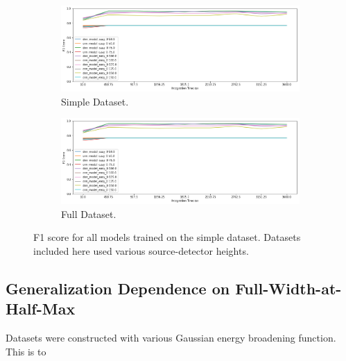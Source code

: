 \begin{figure}[H]
     \centering
     \begin{subfigure}[b]{0.9\textwidth}
         \centering
         \includegraphics[width=\textwidth]{images/results_easy_distance_comparison}
         \caption{Simple Dataset.}
         \label{fig:results_easy_distance_comparison_simple}
     \end{subfigure}

     \begin{subfigure}[b]{0.9\textwidth}
         \centering
         \includegraphics[width=\textwidth]{images/results_easy_distance_comparison}
         \caption{Full Dataset.}
         \label{fig:results_easy_distance_comparison_full}
     \end{subfigure}
        \caption{F1 score for all models trained on the simple dataset. Datasets included here used various source-detector heights.}
        \label{fig:results_easy_distance_comparison}
\end{figure}



\subsection{Generalization Dependence on Full-Width-at-Half-Max}

Datasets were constructed with various Gaussian energy broadening function. This is to 

